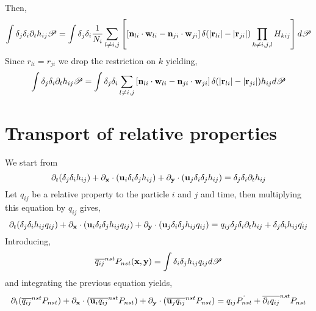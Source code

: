 Then, 
\begin{equation*}
    \int \delta_j\delta_i\partial_t h_{ij} \mathscr{P}
    = \int \delta_j \delta_i
    \frac{1}{N_i} \sum_{l \neq i,j} \left[
        \left[
    \textbf{n}_{li}\cdot \textbf{w}_{li}
    - 
    \textbf{n}_{ji}\cdot\textbf{w}_{ji}
    \right]\delta(|\textbf{r}_{li}| - |\textbf{r}_{ji}|)
        \prod_{k \neq i,j,l}
        H_{kij} 
        \right] d\mathscr{P}
\end{equation*}
Since $r_{li} = r_{ji}$ we drop the restriction on $k$ yielding, 
\begin{equation*}
    \int \delta_j\delta_i\partial_t h_{ij} \mathscr{P}
    = \int \delta_j \delta_i
    \sum_{l \neq i,j} \left[
    \textbf{n}_{li}\cdot \textbf{w}_{li}
    - 
    \textbf{n}_{ji}\cdot\textbf{w}_{ji}
    \right]\delta(|\textbf{r}_{li}| - |\textbf{r}_{ji}|)
        h_{ij}d\mathscr{P}
\end{equation*}


\section{Transport of relative properties}

We start from 
\begin{equation}
    \partial_t (\delta_j\delta_i h_{ij}) + \partial_\textbf{x} \cdot (\textbf{u}_i \delta_i\delta_j h_{ij}) + \partial_\textbf{y} \cdot (\textbf{u}_j \delta_i\delta_j h_{ij}) = \delta_j\delta_i\partial_t h_{ij}
\end{equation}
Let $q_{ij}$ be a relative property to the particle $i$ and $j$ and time, then multiplying this equation by $q_{ij}$ gives,
\begin{equation}
    \partial_t (\delta_j\delta_i h_{ij}q_{ij}) 
    + \partial_\textbf{x} \cdot (\textbf{u}_i \delta_i\delta_j h_{ij}q_{ij}) 
    + \partial_\textbf{y} \cdot (\textbf{u}_j \delta_i\delta_j h_{ij}q_{ij}) 
    = q_{ij}\delta_j\delta_i\partial_t h_{ij}
    + \delta_j\delta_i h_{ij}\dot{q_{ij}}
\end{equation}
Introducing, 
\begin{equation*}
    \overline{q_{ij}}^{nst} P_{nst}(\textbf{x},\textbf{y})= \int\delta_i\delta_j h_{ij}q_{ij} d\mathscr{P} 
\end{equation*}
and integrating the previous equation yields, 
\begin{equation}
    \partial_t (\overline{q_{ij}}^{nst} P_{nst}) 
    + \partial_\textbf{x} \cdot (\overline{\textbf{u}_i q_{ij}}^{nst} P_{nst}) 
    + \partial_\textbf{y} \cdot (\overline{\textbf{u}_j q_{ij}}^{nst}P_{nst}) 
    = q_{ij}\dot{P_{nst}}
    + \overline{\partial_t q_{ij}}^{nst}P_{nst}
\end{equation}

